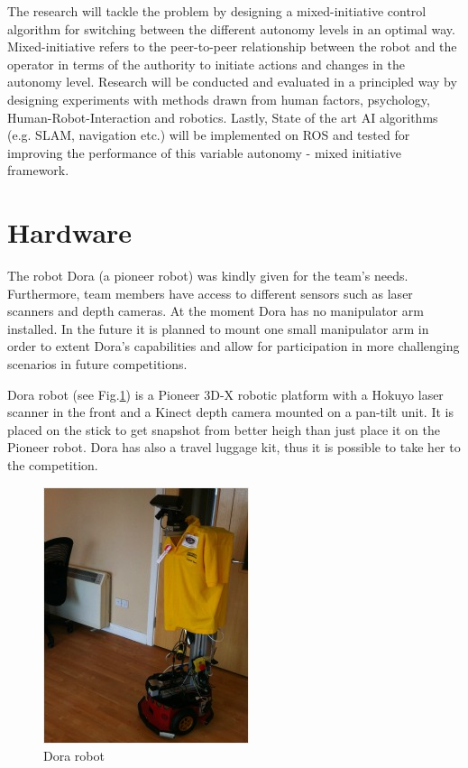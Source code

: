 \documentclass[conference]{IEEEtran}
\begin{document}
The research will tackle the problem by designing a mixed-initiative control algorithm for switching between the different autonomy levels in an optimal way. Mixed-initiative refers to the peer-to-peer relationship between the robot and the operator in terms of the authority to initiate actions and changes in the autonomy level. Research will be conducted and evaluated in a principled way by designing experiments with methods drawn from human factors, psychology, Human-Robot-Interaction and robotics. Lastly, State of the art AI algorithms (e.g. SLAM, navigation etc.) will be implemented on ROS and tested for improving the performance of this variable autonomy - mixed initiative framework.


\section{Hardware}
The robot Dora (a pioneer robot) was kindly given for the team's needs. Furthermore, team members have access to different sensors such as laser scanners and depth cameras. At the moment Dora has no manipulator arm installed. In the future it is planned to mount one small manipulator arm in order to extent Dora's capabilities and allow for participation in more challenging scenarios in future competitions.

Dora robot (see Fig.\ref{fig:dora}) is a Pioneer 3D-X robotic platform with a Hokuyo laser scanner in the front and a Kinect depth camera mounted on a pan-tilt unit. It is placed on the stick to get snapshot from better heigh than just place it on the Pioneer robot. Dora has also a travel luggage kit, thus it is possible to take her to the competition.


\begin{figure}[!t]
\centering
\includegraphics[width=2.in]{dorafinal.jpg}
\caption{Dora robot}
\label{fig:dora}
\end{figure}
\end{document}
